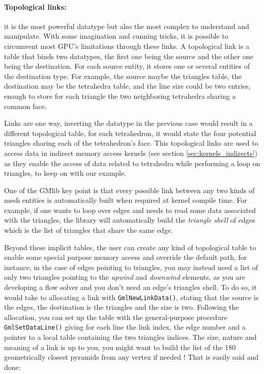 \documentclass[a4paper,12pt]{article}
\begin{document}
\paragraph{Topological links:} it is the most powerful datatype but also the most complex to understand and manipulate. With some imagination and cunning tricks, it is possible to circumvent most GPU's limitations through these links. A topological link is a table that binds two datatypes, the first one being the source and the other one being the destination. For each source entity, it stores one or several entities of the destination type. For example, the source maybe the triangles table, the destination may be the tetrahedra table, and the line size could be two entries, enough to store for each triangle the two neighboring tetrahedra sharing a common face.

Links are one way, inverting the datatype in the previous case would result in a different topological table, for each tetrahedron, it would state the four potential triangles sharing each of the tetrahedron's face. This topological links are used to access data in indirect memory access kernels (see section \ref{sec:kernels_indirects}) as they enable the access of data related to tetrahedra while performing a loop on triangles, to keep on with our example.

One of the GMlib key point is that every possible link between any two kinds of mesh entities is automatically built when required at kernel compile time. For example, if one wants to loop over edges and needs to read some data associated with the triangles, the library will automatically build the \emph{triangle shell} of edges which is the list of triangles that share the same edge.

Beyond these implicit tables, the user can create any kind of topological table to enable some special purpose memory access and override the default path, for instance, in the case of edges pointing to triangles, you may instead need a list of only two triangles pointing to the \emph{upwind} and \emph{downwind} elements, as you are developing a flow solver and you don't need an edge's triangles shell. To do so, it would take to allocating a link with {\tt GmlNewLinkData()}, stating that the source is the edges, the destination is the triangles and the size is two. Following the allocation, you can set up the table with the general-purpose procedure {\tt GmlSetDataLine()} giving for each line the link index, the edge number and a pointer to a local table containing the two triangles indices. The size, nature and meaning of a link is up to you, you might want to build the list of the 180 geometrically closest pyramids from any vertex if needed !
That is easily said and done:
\end{document}
